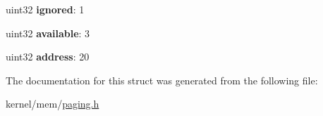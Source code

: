 \begin{DoxyCompactItemize}
\item 
\hypertarget{structpage__directory__entry_a6d2da8241f26516b95c5c7389a4ab04d}{
uint32 {\bfseries ignored}: 1}
\label{structpage__directory__entry_a6d2da8241f26516b95c5c7389a4ab04d}

\item 
\hypertarget{structpage__directory__entry_a597c3f9bf94517c53524257c2c66823c}{
uint32 {\bfseries available}: 3}
\label{structpage__directory__entry_a597c3f9bf94517c53524257c2c66823c}

\item 
\hypertarget{structpage__directory__entry_a953ab53b1ca116122a0d3387188220ad}{
uint32 {\bfseries address}: 20}
\label{structpage__directory__entry_a953ab53b1ca116122a0d3387188220ad}

\end{DoxyCompactItemize}


The documentation for this struct was generated from the following file:\begin{DoxyCompactItemize}
\item 
kernel/mem/\hyperlink{paging_8h}{paging.h}\end{DoxyCompactItemize}
